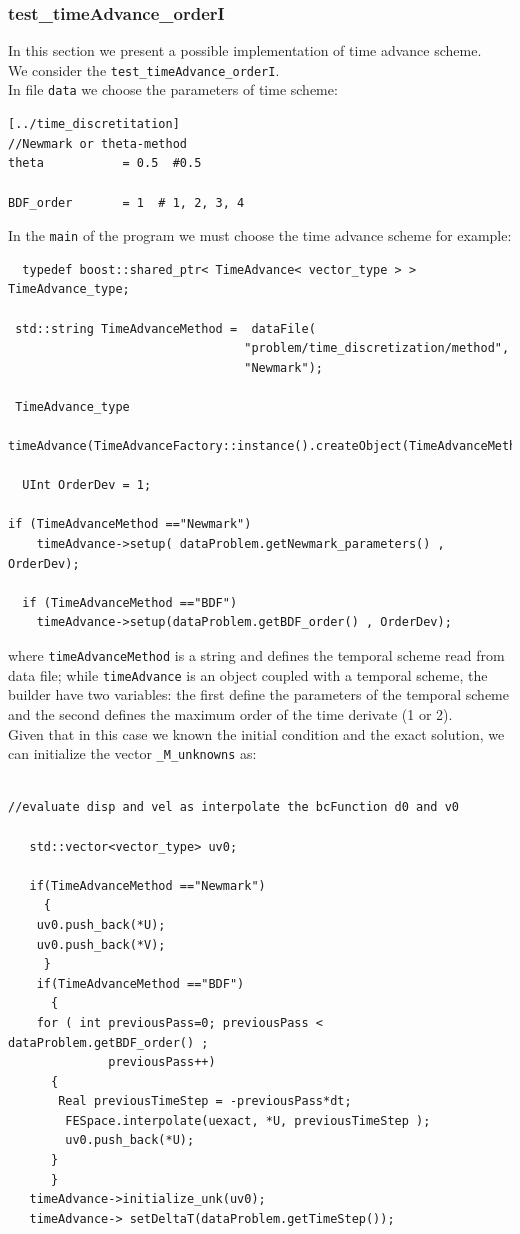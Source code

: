 \documentclass[english,a4paper]{article}
\begin{document}
\subsubsection{test\_timeAdvance\_orderI}
In this section we present a possible implementation of time advance
scheme.\\
We consider the \verb"test_timeAdvance_orderI".\\
In file  \verb"data" we choose the parameters of time scheme:
\begin{verbatim}
[../time_discretitation]
//Newmark or theta-method
theta           = 0.5  #0.5 

BDF_order       = 1  # 1, 2, 3, 4        
\end{verbatim}
In the \verb"main" of the program we must choose the time advance scheme for
example:
\begin{verbatim}
  typedef boost::shared_ptr< TimeAdvance< vector_type > >   TimeAdvance_type;

 std::string TimeAdvanceMethod =  dataFile(
                                 "problem/time_discretization/method",
                                 "Newmark");

 TimeAdvance_type 
 timeAdvance(TimeAdvanceFactory::instance().createObject(TimeAdvanceMethod)); 

  UInt OrderDev = 1;
 
if (TimeAdvanceMethod =="Newmark")
    timeAdvance->setup( dataProblem.getNewmark_parameters() , OrderDev);
   
  if (TimeAdvanceMethod =="BDF")
    timeAdvance->setup(dataProblem.getBDF_order() , OrderDev);
\end{verbatim}
where \verb"timeAdvanceMethod" is a
string and defines the temporal scheme read  from data
file; while \verb"timeAdvance" is an object coupled with a temporal scheme,
the builder  have two variables: the first define the parameters of
the temporal scheme and the second
defines the maximum order of the
time derivate (1 or 2).\\ 
Given that in this case we known the initial condition and the exact
solution,  we can initialize the vector \verb"_M_unknowns" as:
\begin{verbatim}

//evaluate disp and vel as interpolate the bcFunction d0 and v0
    
   std::vector<vector_type> uv0;
  
   if(TimeAdvanceMethod =="Newmark")
     {
    uv0.push_back(*U);
    uv0.push_back(*V);
     }
    if(TimeAdvanceMethod =="BDF")
      {
	for ( int previousPass=0; previousPass < dataProblem.getBDF_order() ; 
              previousPass++)
	  {
	   Real previousTimeStep = -previousPass*dt;
	    FESpace.interpolate(uexact, *U, previousTimeStep );
	    uv0.push_back(*U);
	  }
      }
   timeAdvance->initialize_unk(uv0);
   timeAdvance-> setDeltaT(dataProblem.getTimeStep());
\end{verbatim}
\end{document}
